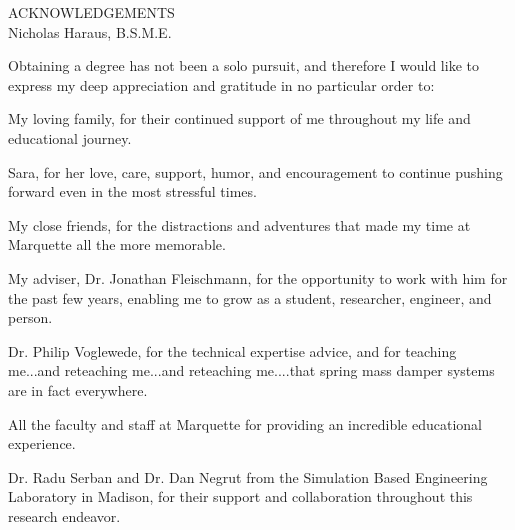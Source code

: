 \documentclass[12pt,onecolumn]{report}
\begin{document}
\setcounter{page}{1}
\begin{singlespacing}
\begin{centering}
ACKNOWLEDGEMENTS\\
\vspace{0.2in}
Nicholas Haraus, B.S.M.E.\\
\end{centering}
\vspace{0.2in}

Obtaining a degree has not been a solo pursuit, and therefore I would like to express my deep appreciation and gratitude in no particular order to:
\vspace{0.2in}

My loving family, for their continued support of me throughout my life and educational journey.


Sara, for her love, care, support, humor, and encouragement to continue pushing forward even in the most stressful times.


My close friends, for the distractions and adventures that made my time at Marquette all the more memorable.


My adviser, Dr. Jonathan Fleischmann, for the opportunity to work with him for the past few years, enabling me to grow as a student, researcher, engineer, and person. 


Dr. Philip Voglewede, for the technical expertise advice, and for teaching me...and reteaching me...and reteaching me....that spring mass damper systems are in fact everywhere.


All the faculty and staff at Marquette for providing an incredible educational experience.


Dr. Radu Serban and Dr. Dan Negrut from the Simulation Based Engineering Laboratory in Madison, for their support and collaboration throughout this research endeavor. 

\end{singlespacing}

\begin{singlespace}
\newpage
\begingroup
\renewcommand{\vspace}[2]{}%
\tableofcontents
\endgroup




\newpage
\begingroup
\renewcommand{\vspace}[2]{}%
{}
\listoftables
\endgroup
\newpage
\begingroup
{}
\renewcommand{\vspace}[2]{}%
\listoffigures
\endgroup
\end{singlespace}
\end{document}
